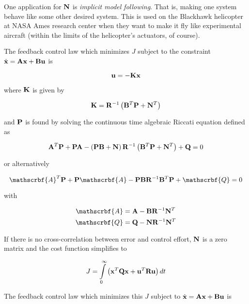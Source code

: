 One application for $\mathbf{N}$ is \textit{implicit model following}. That is,
making one system behave like some other desired system. This is used on the
Blackhawk helicopter at NASA Ames research center when they want to make it fly
like experimental aircraft (within the limits of the helicopter's actuators, of
course).

The feedback \gls{control law} which minimizes $J$ subject to the constraint
$\dot{\mathbf{x}} = \mathbf{A}\mathbf{x} + \mathbf{B}\mathbf{u}$ is

\begin{equation*}
  \mathbf{u} = -\mathbf{K}\mathbf{x}
\end{equation*}

where $\mathbf{K}$ is given by

\begin{equation*}
  \mathbf{K} = \mathbf{R}^{-1} \left(\mathbf{B}^T\mathbf{P} + \mathbf{N}^T\right)
\end{equation*}

and $\mathbf{P}$ is found by solving the continuous time algebraic Riccati equation
defined as

\begin{equation*}
  \mathbf{A}^T\mathbf{P} + \mathbf{P}\mathbf{A} - \left(\mathbf{P}\mathbf{B} +
    \mathbf{N}\right) \mathbf{R}^{-1} \left(\mathbf{B}^T\mathbf{P} + \mathbf{N}^T\right) +
    \mathbf{Q} = 0
\end{equation*}

or alternatively

\begin{equation*}
  \mathscrbf{A}^T\mtx{P} + \mtx{P}\mathscrbf{A} -
    \mtx{P}\mtx{B}\mtx{R}^{-1}\mtx{B}^T\mtx{P} + \mathscrbf{Q} = 0
\end{equation*}

with

\begin{align*}
  \mathscrbf{A} &= \mtx{A} - \mtx{B}\mtx{R}^{-1}\mtx{N}^T \\
  \mathscrbf{Q} &= \mtx{Q} - \mtx{N}\mtx{R}^{-1}\mtx{N}^T
\end{align*}

If there is no cross-correlation between \gls{error} and \gls{control effort},
$\mathbf{N}$ is a zero matrix and the cost function simplifies to

\begin{equation*}
  J = \int\limits_0^\infty
    \left(\mathbf{x}^T\mathbf{Q}\mathbf{x} + \mathbf{u}^T\mathbf{R}\mathbf{u}\right) dt
\end{equation*}

The feedback \gls{control law} which minimizes this $J$ subject to
$\dot{\mathbf{x}} = \mathbf{A}\mathbf{x} + \mathbf{B}\mathbf{u}$ is

